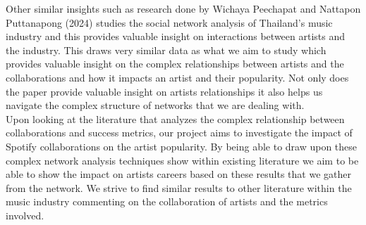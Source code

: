\documentclass[12pt,a4paper]{article}
\begin{document}
Other similar insights such as research done by Wichaya Peechapat and Nattapon Puttanapong (2024) studies the social network analysis of Thailand’s music industry and this provides valuable insight on interactions between artists and the industry.  This draws very similar data as what we aim to study which provides valuable insight on the complex relationships between artists and the collaborations and how it impacts an artist and their popularity.  Not only does the paper provide valuable insight on artists relationships it also helps us navigate the complex structure of networks that we are dealing with.\\

Upon looking at the literature that analyzes the complex relationship between collaborations and success metrics, our project aims to investigate the impact of Spotify collaborations on the artist popularity.  By being able to draw upon these complex network analysis techniques show within existing literature we aim to be able to show the impact on artists careers based on these results that we gather from the network.  We strive to find similar results to other literature within the music industry commenting on the collaboration of artists and the metrics involved.
\end{document}
